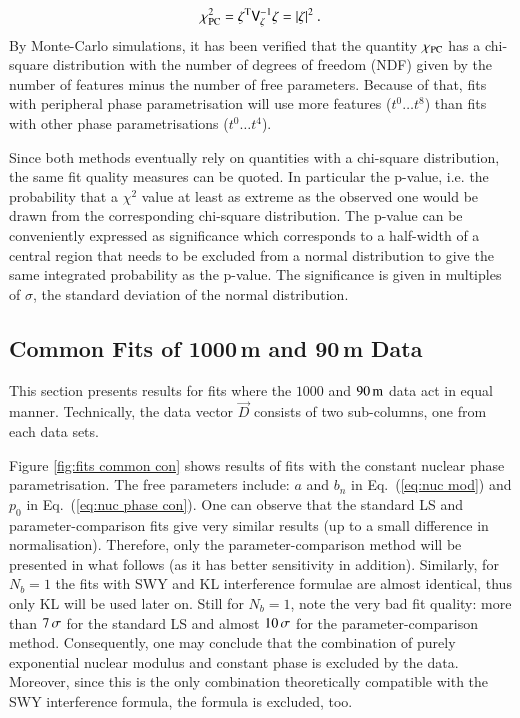 \begin{equation}
\label{eq:chi sq parcmp}
	\chi_{\rm PC}^2 = \mathbf{\zeta}^{\rm T} \mathsf{V}_{\mathbf{\zeta}}^{-1} \mathbf{\zeta} = |\mathbf{\zeta}|^2 \ .
\end{equation}
By Monte-Carlo simulations, it has been verified that the quantity $\chi_{\rm PC}$ has a chi-square distribution with the number of degrees of freedom (NDF) given by the number of features minus the number of free parameters. Because of that, fits with peripheral phase parametrisation will use more features ($t^0 \ldots t^8$) than fits with other phase parametrisations ($t^0 \ldots t^4$).


Since both methods eventually rely on quantities with a chi-square distribution, the same fit quality measures can be quoted. In particular the p-value, i.e. the probability that a $\chi^2$ value at least as extreme as the observed one would be drawn from the corresponding chi-square distribution. The p-value can be conveniently expressed as significance which corresponds to a half-width of a central region that needs to be excluded from a normal distribution to give the same integrated probability as the p-value. The significance is given in multiples of $\sigma$, the standard deviation of the normal distribution.



\subsection{Common Fits of 1000\,m and 90\,m Data}
\label{sec:cni common fits}

This section presents results for fits where the $1000$ and $90\,{\rm m}$ data act in equal manner. Technically, the data vector $\vec D$ consists of two sub-columns, one from each data sets.

Figure \ref{fig:fits common con} shows results of fits with the constant nuclear phase parametrisation. The free parameters include: $a$ and $b_n$ in Eq.~(\ref{eq:nuc mod}) and $p_0$ in Eq.~(\ref{eq:nuc phase con}). One can observe that the standard LS and parameter-comparison fits give very similar results (up to a small difference in normalisation). Therefore, only the parameter-comparison method will be presented in what follows (as it has better sensitivity in addition). Similarly, for $N_b = 1$ the fits with SWY and KL interference formulae are almost identical, thus only KL will be used later on. Still for $N_b = 1$, note the very bad fit quality: more than $7\,{\rm \sigma}$ for the standard LS and almost $10\,{\rm \sigma}$ for the parameter-comparison method. Consequently, one may conclude that the combination of purely exponential nuclear modulus and constant phase is excluded by the data. Moreover, since this is the only combination theoretically compatible with the SWY interference formula, the formula is excluded, too.


